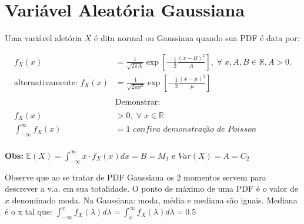 \documentclass{article}
\renewcommand\bf[1]{\textbf{#1}}
\renewcommand\it[1]{\textit{#1}}
\begin{document}
\section{Variável Aleatória Gaussiana}
Uma variável aletória $X$ é dita normal ou Gaussiana quando sua PDF é data por:

\begin{align*}
    f_X(x) &= \frac{1}{\sqrt{2\pi A}} \exp{[-\frac{1}{2} \frac{(x-B)^2}{A}]}, \; \forall \; x, A, B
    \in \mathbb{R}, A > 0. \\
    \text{alternativamente: } f_X(x) &= \frac{1}{\sqrt{2\pi \sigma^2}} \exp{[-\frac{1}{2} \frac{(x-\mu)^2}{\mu}]} \\
    \\
           &\text{Demonstrar:} \\
    \\
    f_X(x) &> 0, \; \forall \; x \in \mathbb{R} \\
    \int^\infty_{-\infty} f_X(x) &= 1 \it{ confira demonstração de Poisson}
\end{align*}
\\
\bf{Obs:} $\mathbb{E}(X) = \int^\infty_{-\infty} x \cdot f_X(x)dx = B = M_1$ e
$Var(X) = A = C_2$

Observe que ao se tratar de PDF Gaussiana os 2 momentos servem para descrever a v.a. em sua
totalidade. O ponto de máximo de uma PDF é o valor de $x$ denominado moda. Na Gaussiana: moda,
média e mediana são iguais. Mediana é o x tal que: $\int^x_{-\infty} f_X(\lambda)d\lambda = \int^\infty_{x} f_X(\lambda) d\lambda = 0.5$
\end{document}
